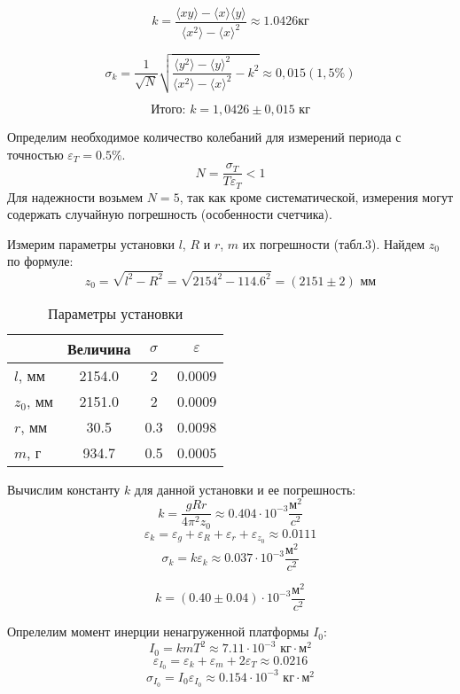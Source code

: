 \documentclass[12pt]{article}
\begin{document}
\[k=\frac{\langle xy\rangle-\langle x\rangle \langle y\rangle}{\langle x^2\rangle - \langle x\rangle^2}\approx 1.0426 кг\]

\[\sigma_{k} = \frac{1}{\sqrt{N}}\sqrt{\frac{\langle y^2 \rangle - \langle y \rangle ^2}{\langle x^2 \rangle - \langle x \rangle ^2} - k^2} \approx 0,015 (1,5\%)\]

\[\text{Итого: } k = 1,0426 \pm 0,015 \text{ кг}\]


		\item Определим необходимое количество колебаний для измерений периода с точностью $\varepsilon_T = 0.5\%$.
		\[N = \dfrac{\sigma_T}{T\varepsilon_T} < 1\]
		Для надежности возьмем $N = 5$, так как кроме систематической, измерения могут содержать случайную погрешность (особенности счетчика).

		\item Измерим параметры установки $l$, $R$ и $r$, $m$ их погрешности (табл.3). Найдем $z_0$ по формуле:
		\[z_0 = \sqrt{l^2 - R^2} = \sqrt{2154^2 - 114.6^2} = (2151 \pm 2) \text{ мм}\]
		
		\begin{table}[h]
			\centering
			\caption{Параметры установки}
			\begin{tabular}{|l|c|c|c|}
				\hline
				& Величина & $\sigma$ & $\varepsilon$ \\
				\hline
				$l$, мм & 2154.0 & 2 & 0.0009 \\
				\hline
				$z_0$, мм & 2151.0 & 2 & 0.0009 \\
				\hline
				$r$, мм & 30.5 & 0.3 & 0.0098 \\
				\hline
				$m$, г & 934.7 & 0.5 & 0.0005 \\
				\hline
			\end{tabular}
		\end{table}
		
		Вычислим константу $k$ для данной установки и ее погрешность:
		\[k = \dfrac{gRr}{4\pi^2z_0} \approx 0.404 \cdot 10^{-3} \frac{\text{м}^2}{c^2}\]
		\[\varepsilon_k = \varepsilon_g + \varepsilon_R + \varepsilon_r + \varepsilon_{z_0} \approx 0.0111\]
		\[\sigma_k = k\varepsilon_k \approx 0.037 \cdot 10^{-3} \frac{\text{м}^2}{c^2}\]
		
		\[k = \left(0.40 \pm 0.04\right) \cdot 10^{-3} \frac{\text{м}^2}{c^2}\]
		
		\item Опрелелим момент инерции ненагруженной платформы $I_0$:
		\[I_0 = kmT^2 \approx 7.11 \cdot 10^{-3} \text{ кг}\cdot\text{м}^2\]
		\[\varepsilon_{I_0} = \varepsilon_k + \varepsilon_m + 2\varepsilon_T \approx 0.0216\]
		\[\sigma_{I_0} = I_0\varepsilon_{I_0} \approx 0.154 \cdot 10^{-3} \text{ кг}\cdot\text{м}^2\]
		
\end{document}
